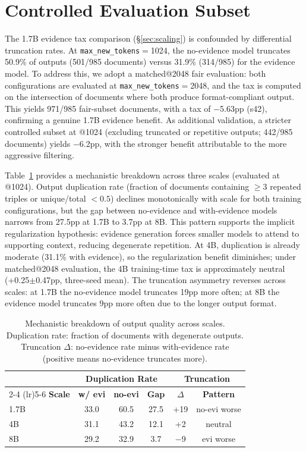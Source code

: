 \section{Controlled Evaluation Subset}
\label{sec:fair_subset}

The 1.7B evidence tax comparison (\S\ref{sec:scaling}) is confounded by differential truncation rates. At \texttt{max\_new\_tokens}$=$1024, the no-evidence model truncates 50.9\% of outputs (501/985 documents) versus 31.9\% (314/985) for the evidence model. To address this, we adopt a matched@2048 fair evaluation: both configurations are evaluated at \texttt{max\_new\_tokens}$=$2048, and the tax is computed on the intersection of documents where both produce format-compliant output. This yields 971/985 fair-subset documents, with a tax of $-$5.63pp (s42), confirming a genuine 1.7B evidence benefit. As additional validation, a stricter controlled subset at @1024 (excluding truncated or repetitive outputs; 442/985 documents) yields $-$6.2pp, with the stronger benefit attributable to the more aggressive filtering.

Table~\ref{tab:mechanistic} provides a mechanistic breakdown across three scales (evaluated at @1024). Output duplication rate (fraction of documents containing $\geq$3 repeated triples or unique/total $< 0.5$) declines monotonically with scale for both training configurations, but the gap between no-evidence and with-evidence models narrows from 27.5pp at 1.7B to 3.7pp at 8B. This pattern supports the implicit regularization hypothesis: evidence generation forces smaller models to attend to supporting context, reducing degenerate repetition. At 4B, duplication is already moderate (31.1\% with evidence), so the regularization benefit diminishes; under matched@2048 evaluation, the 4B training-time tax is approximately neutral (+0.25$\pm$0.47pp, three-seed mean). The truncation asymmetry reverses across scales: at 1.7B the no-evidence model truncates 19pp more often; at 8B the evidence model truncates 9pp more often due to the longer output format.

\begin{table}[t]
\centering
\caption{Mechanistic breakdown of output quality across scales. Duplication rate: fraction of documents with degenerate outputs. Truncation $\Delta$: no-evidence rate minus with-evidence rate (positive means no-evidence truncates more).}
\label{tab:mechanistic}
\small
\begin{tabular}{lccccc}
\toprule
& \multicolumn{3}{c}{\textbf{Duplication Rate}} & \multicolumn{2}{c}{\textbf{Truncation}} \\
\cmidrule(lr){2-4} \cmidrule(lr){5-6}
\textbf{Scale} & \textbf{w/ evi} & \textbf{no-evi} & \textbf{Gap} & \textbf{$\Delta$} & \textbf{Pattern} \\
\midrule
1.7B & 33.0 & 60.5 & 27.5 & +19 & no-evi worse \\
4B & 31.1 & 43.2 & 12.1 & +2 & neutral \\
8B & 29.2 & 32.9 & 3.7 & $-$9 & evi worse \\
\bottomrule
\end{tabular}
\end{table}


